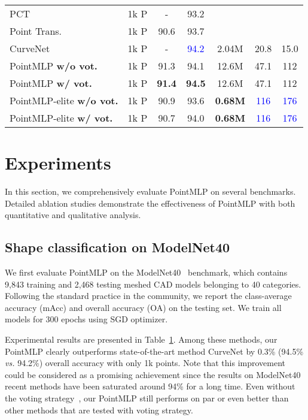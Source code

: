 \begin{table}[]
\begin{tabular}{l|ccc|ccc}
         PCT~\citep{guo2021pct}        &1k P &-&93.2  & & & \\
         Point Trans.~\citep{zhao2021point}  &1k P &90.6&93.7  & & & \\
        CurveNet~\citep{xiang2021walk} &1k P &-&\textcolor{blue}{94.2}  &2.04M & 20.8&15.0 \\
         \midrule
        
        
        
        
        
        
        PointMLP {\small \textbf{w/o vot.}}&1k P &91.3 &94.1  &12.6M &47.1 &112 \\ %
        PointMLP {\small \textbf{w/ vot.}} &1k P &\textbf{91.4} &\textbf{94.5}  &12.6M &47.1 &112\\ 
        PointMLP-elite {\small \textbf{w/o vot.}} &1k P &90.9 &93.6  &\textbf{0.68M} &\textcolor{blue}{116} &\textcolor{blue}{176} \\
        PointMLP-elite {\small \textbf{w/ vot.}} &1k P &90.7 & 94.0 &\textbf{0.68M} &\textcolor{blue}{116} &\textcolor{blue}{176} \\ 
        
         \bottomrule
    \end{tabular}
    \label{tab:classification-modelnet40}
\end{table}

\section{Experiments}
\label{sec:experiments}
In this section, we comprehensively evaluate PointMLP on several benchmarks. Detailed ablation studies demonstrate the effectiveness of PointMLP with both quantitative and qualitative analysis.

\subsection{Shape classification on ModelNet40}
We first evaluate PointMLP on the ModelNet40~\citep{modelnet40} benchmark, which contains 9,843 training and 2,468 testing meshed CAD models belonging to 40 categories. Following the standard practice in the community, we report the class-average accuracy (mAcc) and overall accuracy (OA) on the testing set. We train all models  for 300 epochs using SGD optimizer.

Experimental results are presented in Table~\ref{tab:classification-modelnet40}. Among these methods, our PointMLP clearly outperforms state-of-the-art  method CurveNet  by 0.3\% (94.5\% \textit{vs.} 94.2\%) overall accuracy with only 1k points. Note that this improvement could be considered as a promising achievement since the results on ModelNet40 recent methods have been saturated around 94\% for a long time.
Even without the voting strategy~\citep{liu2019relation}, our PointMLP still performs on par or even better than other methods that are tested with voting strategy.

